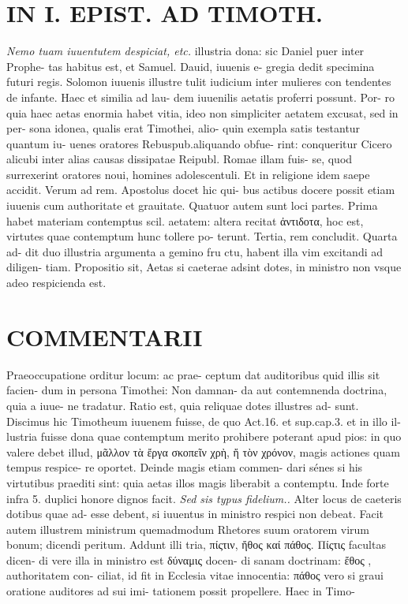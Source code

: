 \documentclass{article}
\begin{document}
\begin{pages}
\section*{IN I. EPIST. AD TIMOTH. }
\marginpar{[ p.105 ]}
\textit{Nemo tuam iuuentutem despiciat, etc. }\pstart illustria dona: sic Daniel puer inter Prophe- tas habitus est, et Samuel. Dauid, iuuenis e- gregia dedit specimina futuri regis. Solomon iuuenis illustre tulit iudicium inter mulieres con tendentes de infante. Haec et similia ad lau- dem iuuenilis aetatis proferri possunt. Por- ro quia haec aetas enormia habet vitia, ideo non simpliciter aetatem excusat, sed in per- sona idonea, qualis erat Timothei, alio- quin exempla satis testantur quantum iu- uenes oratores Rebuspub.aliquando obfue- rint: conqueritur Cicero alicubi inter alias causas dissipatae Reipubl. Romae illam fuis- se, quod surrexerint oratores noui, homines adolescentuli. Et in religione idem saepe accidit.  \pend\pstart Verum ad rem. Apostolus docet hic qui- bus actibus docere possit etiam iuuenis cum authoritate et grauitate. Quatuor autem sunt loci partes. Prima habet materiam contemptus scil. aetatem: altera recitat ἀντιδοτα, hoc est, virtutes quae contemptum hunc tollere po- terunt. Tertia, rem concludit. Quarta ad- dit duo illustria argumenta a gemino fru ctu, habent illa vim excitandi ad diligen- tiam.  \pend\pstart Propositio sit, Aetas si caeterae adsint dotes, in ministro non vsque adeo respicienda est.  \pend
\marginpar{[ p.106 ]}
\section*{COMMENTARII }\pstart Praeoccupatione orditur locum: ac prae- ceptum dat auditoribus quid illis sit facien- dum in persona Timothei: Non damnan- da aut contemnenda doctrina, quia a iuue- ne tradatur.  \pend\pstart Ratio est, quia reliquae dotes illustres ad- sunt. Discimus hic Timotheum iuuenem fuisse, de quo Act.16. et sup.cap.3. et in illo il- lustria fuisse dona quae contemptum merito prohibere poterant apud pios: in quo valere debet illud, μᾶλλον τὰ ἔργα σκοπεῖν χρὴ, ἤ τὸν χρόνον, magis actiones quam tempus respice- re oportet. Deinde magis etiam commen- dari sénes si his virtutibus praediti sint: quia aetas illos magis liberabit a contemptu. Inde forte infra 5. duplici honore dignos facit.  \pend
\textit{Sed sis typus fidelium.. }\pstart Alter locus de caeteris dotibus quae ad- esse debent, si iuuentus in ministro respici non debeat. Facit autem illustrem ministrum quemadmodum Rhetores suum oratorem virum bonum; dicendi peritum. Addunt illi tria, πίςτιν, ἤθος καί πάθος. Πίςτις facultas dicen- di vere illa in ministro est δύναμις docen- di sanam doctrinam:  ἔθος , authoritatem con- ciliat, id fit in Ecclesia vitae innocentia: πάθος vero si graui oratione auditores ad sui imi- tationem possit propellere. Haec in Timo-  \pend

\end{pages}
\end{document}
